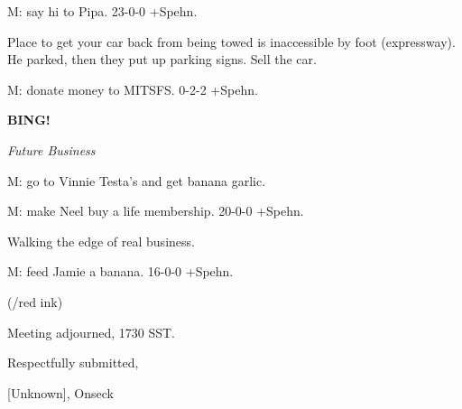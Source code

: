 \documentclass[12pt]{article}
\newcommand{\bing}{{\bf BING!} }
\newcommand{\goto}[1]{\bing \vskip 12pt \centerline{{\em{#1}}}}
\begin{document}
M: say hi to Pipa. 23-0-0 +Spehn.

Place to get your car back from being towed is inaccessible by foot (expressway). He parked, then they put up parking signs. Sell the car.

M: donate money to MITSFS. 0-2-2 +Spehn.

\goto{Future Business}

M: go to Vinnie Testa's and get banana garlic.

M: make Neel buy a life membership. 20-0-0 +Spehn.

Walking the edge of real business.

M: feed Jamie a banana. 16-0-0 +Spehn.

(/red ink)

\vspace{12pt}

\noindent
Meeting adjourned, 1730 SST.

\vspace{18pt}

\centerline{Respectfully submitted,}
\centerline{[Unknown], Onseck}
\end{document}
